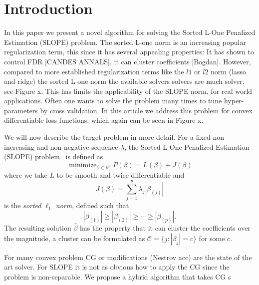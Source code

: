\section{Introduction}\label{sec:introduction}

In this paper we present a novel algorithm for solving the Sorted L-One
Penalized Estimation (SLOPE) problem. The sorted L-one norm is an increasing
popular regularization term, this since it has several appealing properties: It
has shown to control FDR [CANDES ANNALS], it can cluster coefficients [Bogdan].
However, compared to more established regularization terms like the \(l1\) or
\(l2\) norm (lasso and ridge) the sorted L-one norm the available solvers
solvers are much solver, see Figure x. This has limits the applicability of the
SLOPE norm, for real world applications. Often one wants to solve the problem
many times to tune hyper-parameters by cross validation.   In this article we
address this problem for convex differentiable loss functions, which again can
be seen in Figure x.

We will now describe the target problem in more detail.
For a fixed non-increasing and non-negative sequence \(\lambda\), the
Sorted L-One Penalized Estimation (SLOPE) problem~\cite{bogdan2013,bogdan2015}
is defined as
\begin{equation}
  \label{eq:slope-problem}
  \operatorname{minimize}_{\beta \in \mathbb{R}^p}
  P(\beta) = L(\beta) + J(\beta)
\end{equation}
where we take \(L\) to be smooth and twice differentiable and
\begin{equation}
  \label{eq:sortedl-l1-norm}
  J(\beta) = \sum_{j=1}^p \lambda_j|\beta_{(j)}|
\end{equation}
is the \emph{sorted \(\ell_1\) norm}, defined such that
\[
  |\beta_{(1)}| \geq |\beta_{(2)}| \geq \cdots \geq |\beta_{(p)}|.
\]
The resulting solution \(\hat{\beta}\) has the property that it can cluster the
coefficients over the magnitude, a cluster can be formulated as \(\mathcal{C}=
\{j: |\beta_j|=c\}\) for some \(c\).

For many convex problem CG or modifications (Nestrov acc) are the state of the
art solver. For SLOPE it is not as obvious how to apply the CG since the
problem is non-separable. We propose a hybrid algorithm that takes CG s
